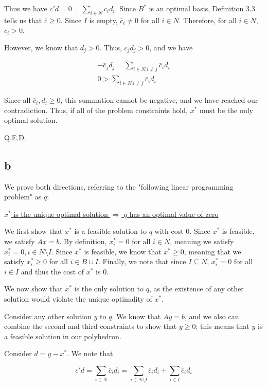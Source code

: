 \documentclass[11pt,a4paper]{article}
\begin{document}
Thus we have $c'd=0=\sum_{i\in N}\bar{c}_id_i$. Since $B^*$ is an optimal basis, Definition 3.3 tells us that $\bar{c}\geq 0$. Since $I$ is empty, $\bar{c}_i\neq 0$ for all $i\in N$. Therefore, for all $i\in N$, $\bar{c}_i>0$. 

However, we know that $d_j>0$. Thus, $\bar{c}_jd_j>0$, and we have

\begin{equation}
\begin{split}
-\bar{c}_jd_j=\sum_{i\in N|i\neq j}\bar{c}_id_i\\
0>\sum_{i\in N|i\neq j}\bar{c}_id_i
\end{split}
\end{equation}

Since all $\bar{c}_i, d_i\geq0$, this summation cannot be negative, and we have reached our contradiction. Thus, if all of the problem constraints hold, $x^*$ must be the only optimal solution.

Q.E.D.

\subsection{b}

We prove both directions, referring to the "following linear programming problem" as $q$:

\underline{$x^*$ is the unique optimal solution $\Rightarrow$ $q$ has an optimal value of zero}

We first show that $x^*$ is a feasible solution to $q$ with cost $0$. Since $x^*$ is feasible, we satisfy $Ax=b$. By definition, $x^*_i=0$ for all $i\in N$, meaning we satisfy $x^*_i=0, i\in N\texttt{\textbackslash} I$. Since $x^*$ is feasible, we know that $x^*\geq 0$, meaning that we satisfy $x^*_i\geq 0$ for all $i\in B\cup I$. Finally, we note that since $I\subseteq N$, $x^*_i=0$ for all $i\in I$ and thus the cost of $x^*$ is 0. 

We now show that $x^*$ is the only solution to $q$, as the existence of any other solution would violate the unique optimality of $x^*$.

Consider any other solution $y$ to $q$. We know that $Ay=b$, and we also can combine the second and third constraints to show that $y\geq 0$; this means that $y$ is a feasible solution in our polyhedron.

Consider $d=y-x^*$. We note that 

$$
c'd=\sum_{i\in N}\bar{c}_id_i=\sum_{i\in N\texttt{\textbackslash}I}\bar{c}_id_i+\sum_{i\in I}\bar{c}_id_i
$$
\end{document}
